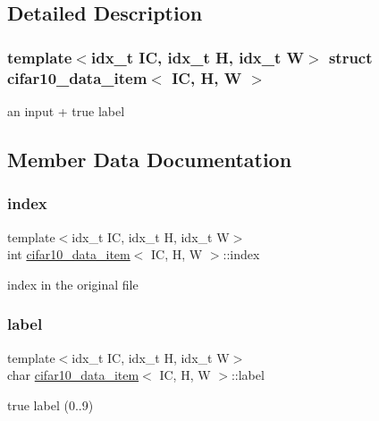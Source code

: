 \subsection{Detailed Description}
\subsubsection*{template$<$idx\+\_\+t IC, idx\+\_\+t H, idx\+\_\+t W$>$\newline
struct cifar10\+\_\+data\+\_\+item$<$ I\+C, H, W $>$}

an input + true label 

\subsection{Member Data Documentation}
\mbox{\label{structcifar10__data__item_a316b080a202c3a6d2dc9d9b573bece65}} 
\subsubsection{\texorpdfstring{index}{index}}
{\footnotesize\ttfamily template$<$idx\+\_\+t IC, idx\+\_\+t H, idx\+\_\+t W$>$ \\
int \hyperlink{structcifar10__data__item}{cifar10\+\_\+data\+\_\+item}$<$ IC, H, W $>$\+::index}

index in the original file \mbox{\label{structcifar10__data__item_a90ed5833af38c869823166ea01c58edc}} 
\subsubsection{\texorpdfstring{label}{label}}
{\footnotesize\ttfamily template$<$idx\+\_\+t IC, idx\+\_\+t H, idx\+\_\+t W$>$ \\
char \hyperlink{structcifar10__data__item}{cifar10\+\_\+data\+\_\+item}$<$ IC, H, W $>$\+::label}

true label (0..9) \mbox{\label{structcifar10__data__item_a8bf2e62adbe5c3005f79fe3fd72d4e71}} 
